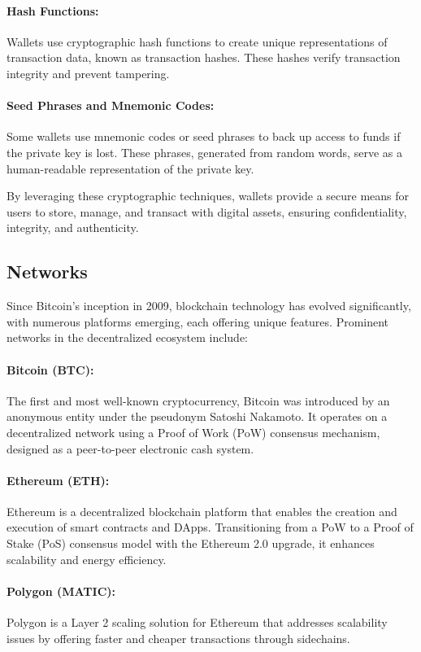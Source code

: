\paragraph{Hash Functions:}
Wallets use cryptographic hash functions to create unique representations of
transaction data, known as transaction hashes. These hashes verify transaction
integrity and prevent tampering.

\paragraph{Seed Phrases and Mnemonic Codes:}
Some wallets use mnemonic codes or seed phrases to back up access to funds if
the private key is lost. These phrases, generated from random words, serve as a
human-readable representation of the private key.

By leveraging these cryptographic techniques, wallets provide a secure means
for users to store, manage, and transact with digital assets, ensuring
confidentiality, integrity, and authenticity.

\subsection{Networks}
\label{subsec:networks}

Since Bitcoin's inception in 2009, blockchain technology has evolved
significantly, with numerous platforms emerging, each offering unique features.
Prominent networks in the decentralized ecosystem include:

\paragraph{Bitcoin (BTC):}
The first and most well-known cryptocurrency, Bitcoin was introduced by an
anonymous entity under the pseudonym Satoshi Nakamoto. It operates on a
decentralized network using a Proof of Work (PoW) consensus mechanism, designed
as a peer-to-peer electronic cash system.

\paragraph{Ethereum (ETH):}
Ethereum is a decentralized blockchain platform that enables the creation and
execution of smart contracts and DApps. Transitioning from a PoW to a Proof of
Stake (PoS) consensus model with the Ethereum 2.0 upgrade, it enhances
scalability and energy efficiency.

\paragraph{Polygon (MATIC):}
Polygon is a Layer 2 scaling solution for Ethereum that addresses scalability
issues by offering faster and cheaper transactions through sidechains.

